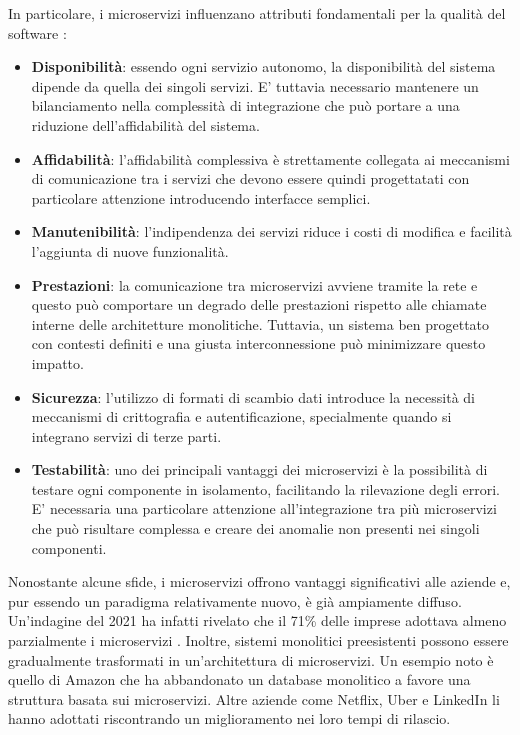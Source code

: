 In particolare, i microservizi influenzano attributi fondamentali per la qualità del software \cite{dragoni2017}:
\begin{itemize}
    \item \textbf{Disponibilità}: essendo ogni servizio autonomo, la disponibilità del sistema dipende da quella dei singoli servizi. E' tuttavia necessario mantenere un bilanciamento nella complessità di integrazione che può portare a una riduzione dell'affidabilità del sistema.
    \item \textbf{Affidabilità}: l'affidabilità complessiva è strettamente collegata ai meccanismi di comunicazione tra i servizi che devono essere quindi progettatati con particolare attenzione introducendo interfacce semplici.
    \item \textbf{Manutenibilità}: l'indipendenza dei servizi riduce i costi di modifica e facilità l'aggiunta di nuove funzionalità.
    \item \textbf{Prestazioni}: la comunicazione tra microservizi avviene tramite la rete e questo può comportare un degrado delle prestazioni rispetto alle chiamate interne delle architetture monolitiche. Tuttavia, un sistema ben progettato con contesti definiti e una giusta interconnessione può minimizzare questo impatto.
    \item \textbf{Sicurezza}: l'utilizzo di formati di scambio dati introduce la necessità di meccanismi di crittografia e autentificazione, specialmente quando si integrano servizi di terze parti.
    \item \textbf{Testabilità}: uno dei principali vantaggi dei microservizi è la possibilità di testare ogni componente in isolamento, facilitando la rilevazione degli errori. E' necessaria una particolare attenzione all'integrazione tra più microservizi che può risultare complessa e creare dei anomalie non presenti nei singoli componenti.
\end{itemize}
Nonostante alcune sfide, i microservizi offrono vantaggi significativi alle aziende e, pur essendo un paradigma relativamente nuovo,
è già ampiamente diffuso. 
Un'indagine del 2021 ha infatti rivelato che il 71\% delle imprese adottava almeno parzialmente i microservizi \cite{stat}.
\newline Inoltre, sistemi monolitici preesistenti possono essere gradualmente trasformati in un'architettura di microservizi.
Un esempio noto è quello di Amazon che ha abbandonato un database monolitico a favore una struttura basata sui microservizi.
Altre aziende come Netflix, Uber e LinkedIn li hanno adottati riscontrando un miglioramento nei loro tempi di rilascio.
